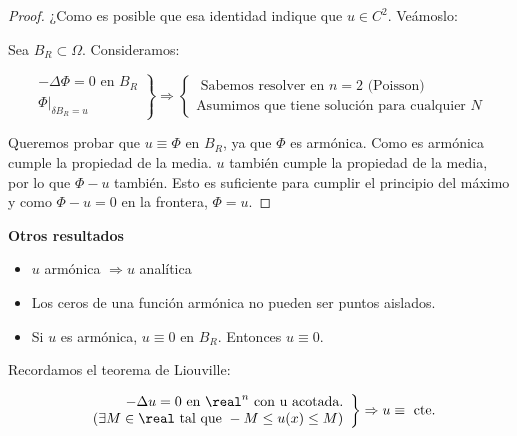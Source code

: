 		\begin{proof}

			¿Como es posible que esa identidad indique que $u \in C^2$. Veámoslo:

			Sea $B_R \subset \Omega$. Consideramos:

			\[ \left. \begin{array}{l}
				- \Delta \Phi = 0 \text{ en } B_R \\
				\Phi |_{\delta B_R = u}
			\end{array} \right\} \Rightarrow \begin{cases}
				\text{ Sabemos resolver en } n = 2 \text{ (Poisson)}\\
				\text{Asumimos que tiene solución para cualquier } N
			\end{cases}
			\]

			Queremos probar que $u \equiv \Phi$ en $B_R$, ya que $\Phi$ es armónica. Como es armónica cumple la propiedad de la media. $u$ también cumple la propiedad de la media, por lo que $\Phi - u$ también. Esto es suficiente para cumplir el principio del máximo y como $\Phi -u = 0$ en la frontera, $\Phi = u$.

		\end{proof}

		\textbf{Otros resultados}

		\begin{itemize}
			\item $u$ armónica $\Rightarrow u$ analítica
			\item Los ceros de una función armónica no pueden ser puntos aislados.
			\item Si $u$ es armónica, $u \equiv 0$ en $B_R$. Entonces $u \equiv 0$.
		\end{itemize}




		Recordamos el teorema de Liouville:

		\begin{theorem}
			\[ \left. \begin{array}{r}
				-\Delta u = 0 \text{ en } \real^n \text{ con u acotada.} \\
				(\exists M \in \real \text{ tal que } - M \leq u(x) \leq M)
			\end{array} \right\} \Rightarrow u \equiv \text{ cte.} \]
		\end{theorem}


